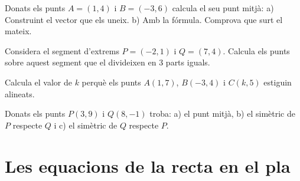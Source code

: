 \begin{mylist}
	 \exer  Donats els punts $A=\left(1,4\right)$ i $B=\left(-3,6\right)$ calcula el seu punt mitjà:
	a) Construint el vector que els uneix.
	b) Amb la fórmula. Comprova que surt el mateix.
	
	\answers{[$\overrightarrow{AB}=(-4,2)$ i $M=A+\frac{1}{2}\overrightarrow{AB}=(1,4)+(-2,1)=(-1,5)$, $M=\frac{A+B}{2}=\frac{(-2,10)}{2}=(-1,5)$]}
	
	\exer  Considera el segment d'extrems $P=\left(-2, 1 \right)$ i $Q=\left(7, 4\right)$. Calcula els punts sobre aquest segment que el divideixen en 3 parts iguals. 
	
	
	\exer Calcula el valor de $k$ perquè els punts $A(1,7)$, $B(-3,4)$ i $C(k,5)$ estiguin alineats.
	
	
	\exer Donats els punts $P(3,9)$ i $Q(8,-1)$ troba: a) el punt mitjà, b) el simètric de $P$ respecte  $Q$ i c) el simètric de $Q$ respecte  $P$.
 
 	\answers{[$M(\frac{11}{2},4)$, $P'(13,-11)$, $Q'(-2,19)$]}
 
	
\end{mylist}

\section{Les equacions de la recta en el pla}


